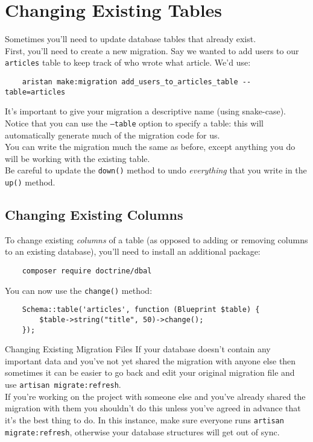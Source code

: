 \section{Changing Existing Tables}

Sometimes you'll need to update database tables that already exist.
\\

First, you'll need to create a new migration. Say we wanted to add users to our \texttt{articles} table to keep track of who wrote what article. We'd use:

\begin{verbatim}
    aristan make:migration add_users_to_articles_table --table=articles
\end{verbatim}

It's important to give your migration a descriptive name (using snake-case). Notice that you can use the \texttt{--table} option to specify a table: this will automatically generate much of the migration code for us.
\\

You can write the migration much the same as before, except anything you do will be working with the existing table.
\\

Be careful to update the \texttt{down()} method to undo \textit{everything} that you write in the \texttt{up()} method.


\subsection{Changing Existing Columns}

To change existing \textit{columns} of a table (as opposed to adding or removing columns to an existing database), you'll need to install an additional package:

\begin{verbatim}
    composer require doctrine/dbal
\end{verbatim}

You can now use the \texttt{change()} method:

\begin{verbatim}
    Schema::table('articles', function (Blueprint $table) {
        $table->string("title", 50)->change();
    });
\end{verbatim}


\begin{infobox}{Changing Existing Migration Files}
    If your database doesn't contain any important data and you've not yet shared the migration with anyone else then sometimes it can be easier to go back and edit your original migration file and use \texttt{artisan migrate:refresh}.
    \\

    If you're working on the project with someone else and you've already shared the migration with them you shouldn't do this unless you've agreed in advance that it's the best thing to do. In this instance, make sure everyone runs \texttt{artisan migrate:refresh}, otherwise your database structures will get out of sync.
\end{infobox}



